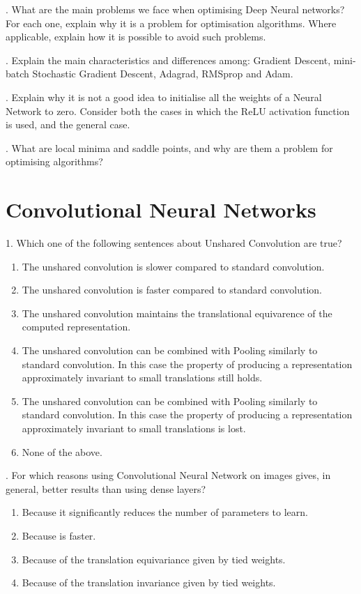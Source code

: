 . What are the main problems we face when optimising Deep Neural networks? For each one, explain why it is a problem for optimisation algorithms. Where applicable, explain how it is possible to avoid such problems.

. Explain the main characteristics and differences among: Gradient Descent, mini-batch Stochastic Gradient Descent, Adagrad, RMSprop and Adam.

. Explain why it is not a good idea to initialise all the weights of a Neural Network to zero. Consider both the cases in which the ReLU activation function is used, and the general case.

. What are local minima and saddle points, and why are them a problem for optimising algorithms?


\newpage
\section{Convolutional Neural Networks}

1. Which one of the following sentences about Unshared Convolution are true?

\begin{enumerate}[label=\roman*]
    \item The unshared convolution is slower compared to standard convolution.
    \item The unshared convolution is faster compared to standard convolution.
    \item The unshared convolution maintains the translational equivarence of the computed representation.
    \item The unshared convolution can be combined with Pooling similarly to standard convolution. In this case the property of producing a representation approximately invariant to small translations still holds.
    \item The unshared convolution can be combined with Pooling similarly to standard convolution. In this case the property of producing a representation approximately invariant to small translations is lost.
    \item None of the above.
\end{enumerate}

. For which reasons using Convolutional Neural Network on images gives, in general, better results than using dense layers?

\begin{enumerate}[label=\roman*]
    \item Because it significantly reduces the number of parameters to learn.
    \item Because is faster.
    \item Because of the translation equivariance given by tied weights.
    \item Because of the translation invariance given by tied weights.
\end{enumerate}

